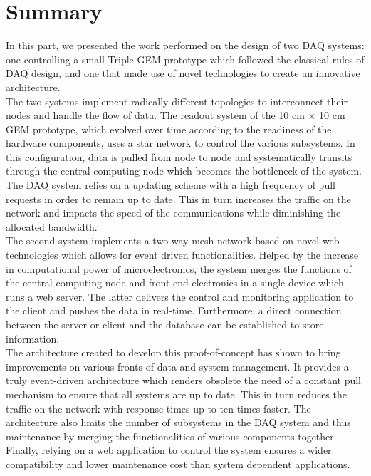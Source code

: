 \chapter{Summary}
\label{chap:III-3-summary}

  In this part, we presented the work performed on the design of two DAQ systems: one controlling a small Triple-GEM prototype which followed the classical rules of DAQ design, and one that made use of novel technologies to create an innovative architecture. \\

  The two systems implement radically different topologies to interconnect their nodes and handle the flow of data. The readout system of the 10 cm $ \times $ 10 cm GEM prototype, which evolved over time according to the readiness of the hardware components, uses a star network to control the various subsystems. In this configuration, data is pulled from node to node and systematically transits through the central computing node which becomes the bottleneck of the system. The DAQ system relies on a updating scheme with a high frequency of pull requests in order to remain up to date. This in turn increases the traffic on the network and impacts the speed of the communications while diminishing the allocated bandwidth. \\

  The second system implements a two-way mesh network based on novel web technologies which allows for event driven functionalities. Helped by the increase in computational power of microelectronics, the system merges the functions of the central computing node and front-end electronics in a single device which runs a web server. The latter delivers the control and monitoring application to the client and pushes the data in real-time. Furthermore, a direct connection between the server or client and the database can be established to store information. \\

  The architecture created to develop this proof-of-concept has shown to bring improvements on various fronts of data and system management. It provides a truly event-driven architecture which renders obsolete the need of a constant pull mechanism to ensure that all systems are up to date. This in turn reduces the traffic on the network with response times up to ten times faster. The architecture also limits the number of subsystems in the DAQ system and thus maintenance by merging the functionalities of various components together. Finally, relying on a web application to control the system ensures a wider compatibility and lower maintenance cost than system dependent applications.
